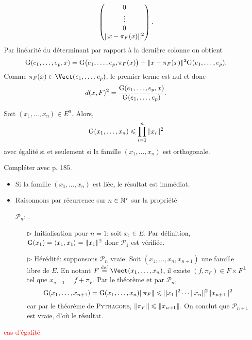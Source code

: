 \begin{preuve}
{$$        \begin{pmatrix}
            0 \\
            \vdots \\
            0 \\
            \Vert x - \pi_F(x) \Vert^2
        \end{pmatrix}.
        $$
    }
    Par linéarité du déterminant par rapport à la dernière colonne \note on obtient
    $$\mathrm{G}(e_1, \dots, e_p, x) = \mathrm{G} \big(e_1, \dots, e_p, \pi_F(x) \big) + \Vert x - \pi_F(x) \Vert^2 \mathrm{G}(e_1, \dots, e_p).$$
    Comme $\pi_F(x) \in \Vect(e_1, \dots, e_p)$, le premier terme est nul et donc 
    $$d(x, F)^2 = \frac{\mathrm{G}(e_1, \dots, e_p, x)}{\mathrm{G}(e_1, \dots, e_p)}.$$
\end{preuve}

\begin{corol} 
    Soit $(x_1, \dots, x_n) \in E^n$. Alors,
    $$\mathrm{G}(x_1, \dots, x_n) \leqslant \prod_{i=1}^n \Vert x_i \Vert^2$$
    avec égalité si et seulement si la famille $(x_1, \dots, x_n)$ est orthogonale. 
\end{corol}

Compléter avec \cite{objectif_agregation} p. 185.

\begin{preuve}
    \begin{itemize}
        \item Si la famille $(x_1, \dots, x_n)$ est liée, le résultat est immédiat.
        \item Raisonnons par récurrence sur $n \in \mathbb{N}^\star$ sur la propriété
        \begin{center}
            $\mathscr{P}_n$: .
        \end{center}
        \begin{itemize}
            \item[$\rhd$] Initialisation pour $n = 1$: soit $x_1 \in E$. Par définition, $\mathrm{G}(x_1) = \langle x_1, x_1 \rangle = \Vert x_1 \Vert^2$ donc $\mathscr{P}_1$ est vérifiée.
            \item[$\rhd$] Hérédité: supponsons $\mathscr{P}_n$ vraie. Soit $(x_1, \dots, x_n, x_{n+1})$ une famille libre de $E$. En notant $F \defeq \Vect(x_1, \dots, x_n)$, il existe $(f, \pi_F) \in F \times F^\perp$ tel que $x_{n+1} = f + \pi_F$. Par le théorème  et par $\mathscr{P}_n$, 
            $$\mathrm{G}(x_1, \dots, x_{n+1}) = \mathrm{G}(x_1, \dots, x_n) \Vert \pi_F \Vert \leqslant \Vert x_1 \Vert^2 \cdots \Vert x_n \Vert^2 \Vert x_{n+1} \Vert^2$$
            car par le théorème de \textsc{Pythagore}, $\Vert \pi_F \Vert \leqslant \Vert x_{n+1} \Vert$. On conclut que $\mathscr{P}_{n+1}$ est vraie, d'où le résultat. 
        \end{itemize}
    \end{itemize}
    \textcolor{red}{cas d'égalité}
\end{preuve}


